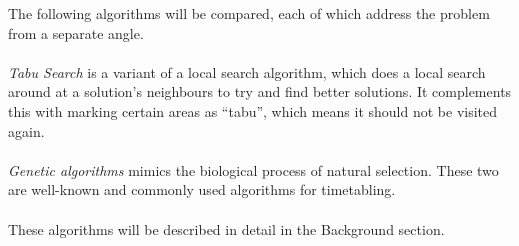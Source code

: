 \documentclass[titlepage,a4paper]{article}
\begin{document}
The following algorithms will be compared, each of which address the problem from a separate angle.\\\\
\emph{Tabu Search} is a variant of a local search algorithm, which does a local search around at a solution’s neighbours to try and find better solutions. It complements this with marking certain areas as “tabu”, which means it should not be visited again\cite{aTabuSearch07}. \\\\
\emph{Genetic algorithms} mimics the biological process of natural selection. These two are well-known and commonly used algorithms for timetabling\cite{guidedSearch09}. \\\\
These algorithms will be described in detail in the Background section.

\pagebreak
\end{document}
